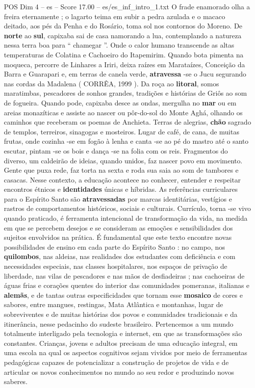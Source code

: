 \begin{textsample}{POS Dim 4 – es – Score 17.00 – es/es\_inf\_intro\_1.txt}
O frade enamorado olha a freira eternamente ; o lagarto teima em subir a pedra azulada e o macaco deitado, aos pés da Penha e do Rosário, toma sol nos contornos do Moreno.
De \textbf{norte} ao \textbf{sul}, capixaba sai de casa namorando a lua, contemplando a natureza nessa terra boa para “ chamegar ”.
Onde o calor humano transcende as altas temperaturas de Colatina e Cachoeiro do Itapemirim.
Quando bota pimenta na moqueca, percorre de Linhares a Iriri, deixa raízes em Marataízes, Conceição da Barra e Guarapari e, em terras de canela verde, \textbf{atravessa} -se o Jucu segurando nas cordas da Madalena ( CORRÊA, 1999 ).
Da roça ao \textbf{litoral}, somos maratimbas, pescadores de sonhos grandes, tradições e histórias de Griôs ao som de fogueira.
Quando pode, capixaba desce as ondas, mergulha no \textbf{mar} ou em areias monazíticas e assiste ao nascer ou pôr-do-sol do Monte Aghá, olhando os caminhos que receberam os poemas de Anchieta.
Terras de alegrias, \textbf{chão} sagrado de templos, terreiros, sinagogas e mosteiros.
Lugar de café, de cana, de muitas frutas, onde cozinha -se em fogão à lenha e canta -se ao pé do mastro até o santo escutar, pintam -se os bois e dança -se na folia com os reis.
Fragmentos do diverso, um caldeirão de ideias, quando unidos, faz nascer povo em movimento.
Gente que puxa rede, faz torta na sexta e roda sua saia ao som de tambores e casacas.
Nesse contexto, a educação acontece no conhecer, entender e respeitar encontros étnicos e \textbf{identidades} únicas e híbridas.
As referências curriculares para o Espírito Santo são \textbf{atravessadas} por marcas identitárias, vestígios e rastros de comportamentos históricos, sociais e culturais.
Currículo, torna -se vivo quando praticado, é ferramenta intencional de transformação da vida, na medida em que se percebem desejos e se consideram as emoções e sensibilidades dos sujeitos envolvidos na prática.
É fundamental que este texto encontre novas possibilidades de ensino em cada parte do Espírito Santo : no campo, nos \textbf{quilombos}, nas aldeias, nas realidades dos estudantes com deficiência e com necessidades especiais, nas classes hospitalares, nos espaços de privação de liberdade, nas vilas de pescadores e nas mãos de desfiadeiras ; nas cachoeiras de águas frias e corações quentes do interior das comunidades pomeranas, italianas e \textbf{alemãs}, e de tantas outras especificidades que tornam esse \textbf{mosaico} de cores e sabores, entre mangues, restingas, Mata Atlântica e montanhas, lugar de sobreviventes e de muitas histórias dos povos e comunidades tradicionais e da itinerância, nesse pedacinho do sudeste brasileiro.
Pertencemos a um mundo totalmente interligado pela tecnologia e internet, em que as transformações são constantes.
Crianças, jovens e adultos precisam de uma educação integral, em uma escola na qual os aspectos cognitivos sejam vividos por meio de ferramentas pedagógicas capazes de potencializar a construção de projetos de vida e de articular os novos conhecimentos no mundo ao seu redor e produzindo novos saberes.

\end{textsample}
